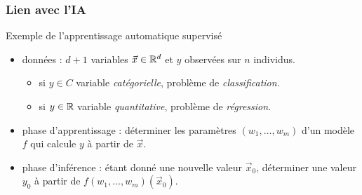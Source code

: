 \documentclass{beamer}
\newcommand{\R}{{\ensuremath\mathbb{R}}}
\begin{document}
\begin{frame}
  \frametitle{Lien avec l'IA}

  \begin{block}{Exemple de l'apprentissage automatique supervisé}

    \begin{itemize}
      \item données : $d+1$ variables $\vec{x} \in \R^d$ et $y$ observées sur $n$ individus. 
        \begin{itemize}
        \item si $y \in C$ variable \emph{catégorielle}, problème de \emph{classification}. 
        \item si $y \in \R$ variable \emph{quantitative}, problème de \emph{régression}. 
        \end{itemize}
      \item phase d'apprentissage : déterminer les paramètres $(w_1, \dots, w_m)$ d'un modèle $f$
        qui calcule $y$ à partir de $\vec{x}$.
      \item phase d'inférence : étant donné une nouvelle valeur $\vec{x}_0$,
        déterminer une valeur $y_0$ à partir de $f(w_1, \dots, w_m)(\vec{x}_0)$. 
    \end{itemize}
  \end{block}

\end{frame}






\end{document}
